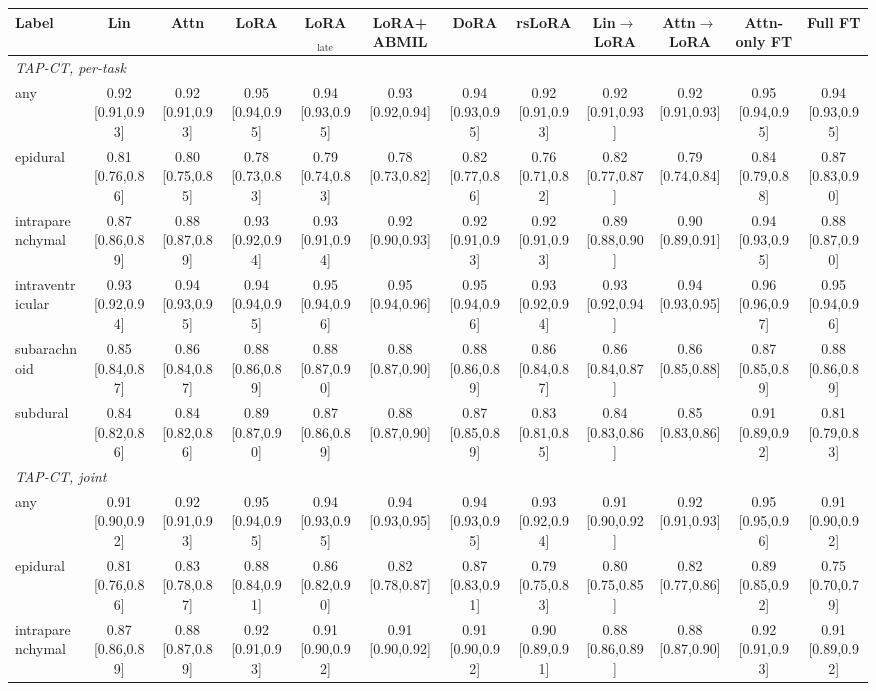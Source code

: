 \begin{tabular}{lccccccccccc}
\toprule
Label & Lin & Attn & LoRA & LoRA$_{\text{late}}$ & LoRA+ABMIL & DoRA & rsLoRA & Lin$\to$LoRA & Attn$\to$LoRA & Attn-only FT & Full FT \\
\midrule
\multicolumn{12}{l}{\textit{TAP-CT, per-task}} \\
any & 0.92 [0.91,0.93] & 0.92 [0.91,0.93] & 0.95 [0.94,0.95] & 0.94 [0.93,0.95] & 0.93 [0.92,0.94] & 0.94 [0.93,0.95] & 0.92 [0.91,0.93] & 0.92 [0.91,0.93] & 0.92 [0.91,0.93] & 0.95 [0.94,0.95] & 0.94 [0.93,0.95] \\
epidural & 0.81 [0.76,0.86] & 0.80 [0.75,0.85] & 0.78 [0.73,0.83] & 0.79 [0.74,0.83] & 0.78 [0.73,0.82] & 0.82 [0.77,0.86] & 0.76 [0.71,0.82] & 0.82 [0.77,0.87] & 0.79 [0.74,0.84] & 0.84 [0.79,0.88] & 0.87 [0.83,0.90] \\
intraparenchymal & 0.87 [0.86,0.89] & 0.88 [0.87,0.89] & 0.93 [0.92,0.94] & 0.93 [0.91,0.94] & 0.92 [0.90,0.93] & 0.92 [0.91,0.93] & 0.92 [0.91,0.93] & 0.89 [0.88,0.90] & 0.90 [0.89,0.91] & 0.94 [0.93,0.95] & 0.88 [0.87,0.90] \\
intraventricular & 0.93 [0.92,0.94] & 0.94 [0.93,0.95] & 0.94 [0.94,0.95] & 0.95 [0.94,0.96] & 0.95 [0.94,0.96] & 0.95 [0.94,0.96] & 0.93 [0.92,0.94] & 0.93 [0.92,0.94] & 0.94 [0.93,0.95] & 0.96 [0.96,0.97] & 0.95 [0.94,0.96] \\
subarachnoid & 0.85 [0.84,0.87] & 0.86 [0.84,0.87] & 0.88 [0.86,0.89] & 0.88 [0.87,0.90] & 0.88 [0.87,0.90] & 0.88 [0.86,0.89] & 0.86 [0.84,0.87] & 0.86 [0.84,0.87] & 0.86 [0.85,0.88] & 0.87 [0.85,0.89] & 0.88 [0.86,0.89] \\
subdural & 0.84 [0.82,0.86] & 0.84 [0.82,0.86] & 0.89 [0.87,0.90] & 0.87 [0.86,0.89] & 0.88 [0.87,0.90] & 0.87 [0.85,0.89] & 0.83 [0.81,0.85] & 0.84 [0.83,0.86] & 0.85 [0.83,0.86] & 0.91 [0.89,0.92] & 0.81 [0.79,0.83] \\
\multicolumn{12}{l}{\textit{TAP-CT, joint}} \\
any & 0.91 [0.90,0.92] & 0.92 [0.91,0.93] & 0.95 [0.94,0.95] & 0.94 [0.93,0.95] & 0.94 [0.93,0.95] & 0.94 [0.93,0.95] & 0.93 [0.92,0.94] & 0.91 [0.90,0.92] & 0.92 [0.91,0.93] & 0.95 [0.95,0.96] & 0.91 [0.90,0.92] \\
epidural & 0.81 [0.76,0.86] & 0.83 [0.78,0.87] & 0.88 [0.84,0.91] & 0.86 [0.82,0.90] & 0.82 [0.78,0.87] & 0.87 [0.83,0.91] & 0.79 [0.75,0.83] & 0.80 [0.75,0.85] & 0.82 [0.77,0.86] & 0.89 [0.85,0.92] & 0.75 [0.70,0.79] \\
intraparenchymal & 0.87 [0.86,0.89] & 0.88 [0.87,0.89] & 0.92 [0.91,0.93] & 0.91 [0.90,0.92] & 0.91 [0.90,0.92] & 0.91 [0.90,0.92] & 0.90 [0.89,0.91] & 0.88 [0.86,0.89] & 0.88 [0.87,0.90] & 0.92 [0.91,0.93] & 0.91 [0.89,0.92] \\

\end{tabular}
